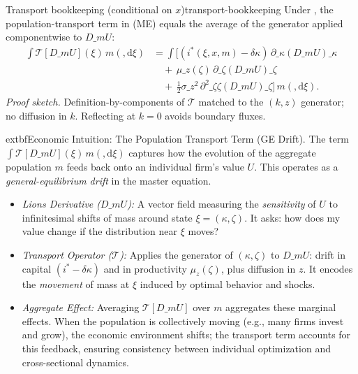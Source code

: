 ﻿\documentclass[11pt,letterpaper,oneside]{article}
\numberwithin{equation}{section}
\newcommand{\1}{\mathbf{1}}
\newcommand{\diff}{,\mathrm{d}}
\newcommand{\Dm}{D\_m}
\begin{document}
\begin{lemma}{Transport bookkeeping (conditional on $x$)}{transport-bookkeeping}
Under , the population-transport term in (ME) equals the average of the generator applied componentwise to $\Dm U$:
\[
\begin{aligned}
\int \mathcal{T}[\Dm U](\xi)\, m(\diff \xi)
&= \int \Big[(i^*(\xi,x,m)-\delta\kappa)\,\partial\_{\kappa}(\Dm U)\!\_\kappa \\
&\quad +\, \mu\_z(\zeta)\,\partial\_{\zeta}(\Dm U)\!\_\zeta \\
&\quad +\, \tfrac12\sigma\_z^2\,\partial^2\_{\zeta\zeta}(\Dm U)\!\_\zeta\Big] \, m(\diff \xi).
\end{aligned}
\]
\emph{Proof sketch.} Definition-by-components of $\mathcal{T}$ matched to the $(k,z)$ generator; no diffusion in $k$. Reflecting at $k=0$ avoids boundary fluxes.
\end{lemma}

\begin{tcolorbox}[didacticstyle]
  	extbf{Economic Intuition: The Population Transport Term (GE Drift).}
The term $\int \mathcal{T}[\Dm U](\xi)\, m(\diff \xi)$ captures how the evolution of the aggregate population $m$ feeds back onto an individual firm's value $U$. This operates as a \emph{general-equilibrium drift} in the master equation.
\begin{itemize}[leftmargin=1.15em,itemsep=0.25em]
  \item \emph{Lions Derivative ($\Dm U$):} A vector field measuring the \emph{sensitivity} of $U$ to infinitesimal shifts of mass around state $\xi=(\kappa,\zeta)$. It asks: how does my value change if the distribution near $\xi$ moves?
  \item \emph{Transport Operator ($\mathcal{T}$):} Applies the generator of $(\kappa,\zeta)$ to $\Dm U$: drift in capital $(i^*-\delta\kappa)$ and in productivity $\mu_z(\zeta)$, plus diffusion in $z$. It encodes the \emph{movement} of mass at $\xi$ induced by optimal behavior and shocks.
  \item \emph{Aggregate Effect:} Averaging $\mathcal{T}[\Dm U]$ over $m$ aggregates these marginal effects. When the population is collectively moving (e.g., many firms invest and grow), the economic environment shifts; the transport term accounts for this feedback, ensuring consistency between individual optimization and cross-sectional dynamics.
\end{itemize}
\end{tcolorbox}
\end{document}

